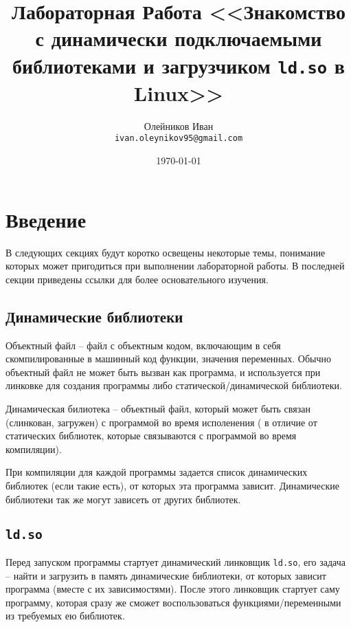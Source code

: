 \documentclass[a4paper,titlepage]{article}
\begin{document}
\title{Лабораторная Работа
<<Знакомство с динамически подключаемыми библиотеками и загрузчиком \texttt{ld.so} в Linux>>}
\author{Олейников Иван \\ \texttt{ivan.oleynikov95@gmail.com}}
\date{\today}
\maketitle

\tableofcontents

\lstset{
  language=bash,
  frame=single,
  basicstyle=\scriptsize\ttfamily,
  breakatwhitespace=true,
  breaklines=true
}

\section{Введение}

В следующих секциях будут коротко освещены некоторые темы, понимание которых
может пригодиться при выполнении лабораторной работы. В последней секции
приведены ссылки для более основательного изучения.

\subsection{Динамические библиотеки}

Объектный файл -- файл с объектным кодом, включающим в себя скомпилированные в
машинный код функции, значения переменных. Обычно объектный файл не может быть
вызван как программа, и используется при линковке для создания программы либо
статической/динамической библиотеки.

Динамическая билиотека -- объектный файл, который может быть связан (слинкован,
загружен) с программой во время исполенения ( в отличие от статических
библиотек, которые связываются с программой во время компиляции).

При компиляции для каждой программы задается список динамических библиотек (если
такие есть), от которых эта программа зависит. Динамические библиотеки так же
могут зависеть от других библиотек.

\subsection{\texttt{ld.so}}

Перед запуском программы стартует динамический линковщик \texttt{ld.so}, его
задача -- найти и загрузить в память динамические библиотеки, от которых зависит
программа (вместе с их зависимостями). После этого линковщик стартует саму
программу, которая сразу же сможет воспользоваться функциями/переменными из
требуемых ею библиотек.
\end{document}
